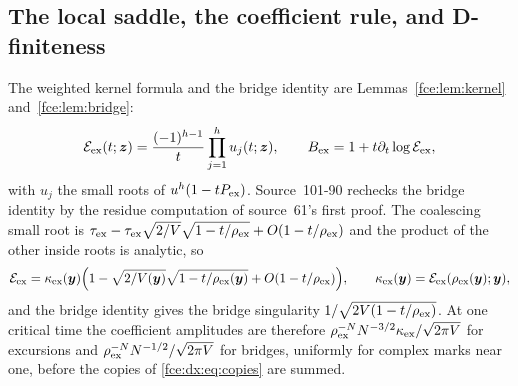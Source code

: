 \documentclass[11pt,a4paper]{article}
\numberwithin{equation}{section}
\theoremstyle{definition}\newtheorem{definition}[theorem]{Definition}
\theoremstyle{remark}\newtheorem{remark}[theorem]{Remark}
\newcommand{\E}{\mathcal E}
\begin{document}
\subsection{The local saddle, the coefficient rule, and D-finiteness}\label{fce:dx:sec:recipe}
The weighted kernel formula \cite[Theorem~2]{bf} and the bridge identity
\cite[Corollary~2]{bf} are Lemmas~\ref{fce:lem:kernel} and~\ref{fce:lem:bridge}:
\begin{equation}\label{fce:dx:eq:product}
 \E_{\rm ex}(t;\boldsymbol z)=\frac{(-1)^{h-1}}t\prod_{j=1}^hu_j(t;\boldsymbol z),
 \qquad B_{\rm ex}=1+t\partial_t\log\E_{\rm ex},
\end{equation}
with $u_j$ the small roots of $u^h(1-tP_{\rm ex})$. Source~101-90 rechecks the
bridge identity by the residue computation of source~61's first proof. The
coalescing small root is
$\tau_{\rm ex}-\tau_{\rm ex}\sqrt{2/V}\sqrt{1-t/\rho_{\rm ex}}+O(1-t/\rho_{\rm ex})$
and the product of the other inside roots is analytic, so
\begin{equation}\label{fce:dx:eq:local}
 \E_{\rm ex}=\kappa_{\rm ex}(\boldsymbol y)\Bigl(1-\sqrt{2/V(\boldsymbol y)}\sqrt{1-t/\rho_{\rm ex}(\boldsymbol y)}
 +O(1-t/\rho_{\rm ex})\Bigr),\qquad
 \kappa_{\rm ex}(\boldsymbol y)=\E_{\rm ex}(\rho_{\rm ex}(\boldsymbol y);\boldsymbol y),
\end{equation}
and the bridge identity gives the bridge singularity
$1/\sqrt{2V(1-t/\rho_{\rm ex})}$. At one critical time the coefficient
amplitudes are therefore
$\rho_{\rm ex}^{-N}N^{-3/2}\kappa_{\rm ex}/\sqrt{2\pi V}$ for excursions and
$\rho_{\rm ex}^{-N}N^{-1/2}/\sqrt{2\pi V}$ for bridges, uniformly for complex
marks near one, before the copies of \eqref{fce:dx:eq:copies} are summed.
\end{document}
